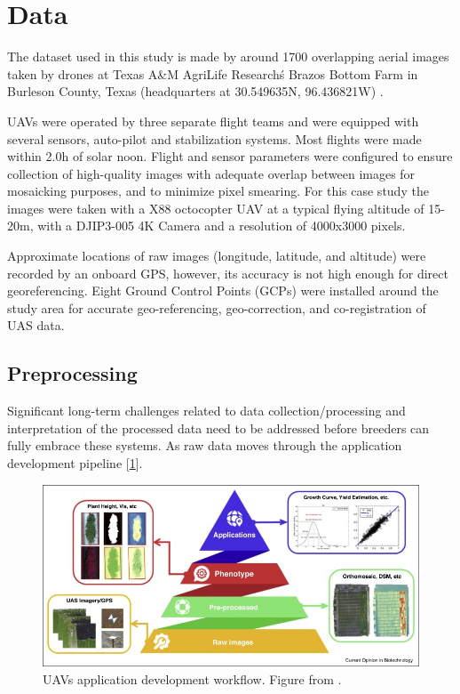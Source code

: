 \section{Data}
\label{sec:data}

The dataset used in this study is made by around 1700 overlapping aerial images taken by drones at Texas A\&M AgriLife Research\'s Brazos Bottom Farm in Burleson County, Texas (headquarters at 30.549635N, 96.436821W) \cite{shi_2021_5089956}.

UAVs were operated by three separate flight teams and were equipped with several sensors, auto-pilot and stabilization systems.
Most flights were made within 2.0h of solar noon. Flight and sensor parameters were configured to ensure collection of high-quality images with adequate overlap between images for mosaicking purposes, and to minimize pixel smearing.
For this case study the images were taken with a X88 octocopter UAV at a typical flying altitude of 15-20m, with a DJIP3-005 4K Camera and a resolution of 4000x3000 pixels.

Approximate locations of raw images (longitude, latitude, and altitude) were recorded by an onboard GPS, however, its accuracy is not high enough for direct georeferencing. Eight Ground Control Points (GCPs) were installed around the study area for accurate geo-referencing, geo-correction, and co-registration of UAS data.

\subsection{Preprocessing}
\label{sec:preprocessing}

Significant long-term challenges related to data collection/processing and interpretation of the processed data need to be addressed before breeders can fully embrace these systems. As raw data moves through the application development pipeline [\ref{fig:dev_pipeline}].
\begin{figure}[t!]
    \includegraphics[width=\linewidth]{../images/dev_pipeline} 
    \caption{UAVs application development workflow. Figure from \cite{jung2021potential}.}
    \label{fig:dev_pipeline}
\end{figure}

